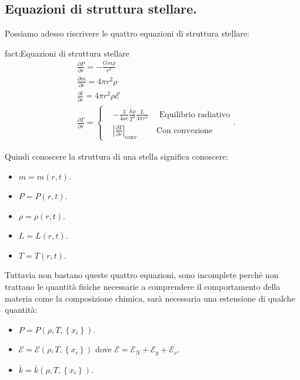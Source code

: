 \subsection{Equazioni di struttura stellare.}
\label{subsec:Equazioni di struttura stellare.}
Possiamo adesso riscrivere le quattro equazioni di struttura stellare:
\begin{fact}{fact:Equazioni di struttura stellare}
	\[\begin{aligned}
		&\frac{\partial P}{\partial r} = -\frac{Gm\rho }{r^2}\\
		&\frac{\partial m}{\partial r} = 4\pi r^2 \rho \\
		&\frac{\partial l}{\partial r} = 4\pi r^2\rho \mathcal{E}\\
		&\frac{\partial T}{\partial r}  = 
		\begin{cases}
			&-\frac{3}{4ac}\frac{\overline{k}\rho }{T^3}\frac{L}{4\pi r^2} \quad \text{ Equilibrio radiativo}\\
			& \left| \frac{\partial T}{\partial r}  \right|_\text{conv} \quad \quad \text{ Con convezione}
		\end{cases}
	.\end{aligned}\]
\end{fact}
Quindi conoscere la struttura di una stella significa conoscere:
\begin{itemize}
	\item $m=m(r,t)$.
	\item $P=P(r,t)$.
	\item $\rho = \rho (r,t)$.
	\item $L=L(r,t)$.
	\item $T=T(r,t)$.
\end{itemize}
Tuttavia non bastano queste quattro equazioni, sono incomplete perché non trattano le quantità fisiche necessarie a comprendere il comportamento della materia come la composizione chimica, sarà necessaria una estensione di qualche quantità:
\begin{itemize}
	\item $P=P(\rho ,T,\left\{ x_i \right\} )$.
	\item $\mathcal{E}  = \mathcal{E}(\rho , T, \left\{ x_i \right\} )$ dove $\mathcal{E}  = \mathcal{E}_N+\mathcal{E}_g+\mathcal{E}_\nu$.
	\item $\overline{k}=\overline{k}(\rho ,T,\left\{ x_i \right\} )$.
\end{itemize}
